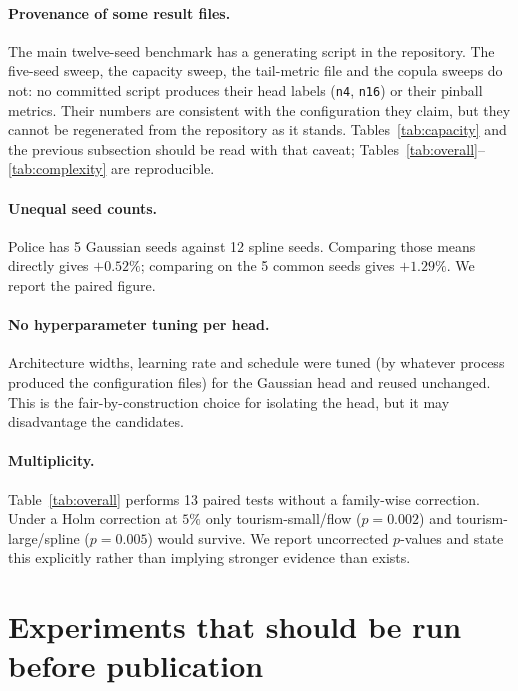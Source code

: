 \documentclass[11pt]{article}
\begin{document}
\paragraph{Provenance of some result files.} The main twelve-seed benchmark has a
generating script in the repository. The five-seed sweep, the capacity sweep, the
tail-metric file and the copula sweeps do not: no committed script produces their
head labels (\texttt{n4}, \texttt{n16}) or their pinball metrics. Their numbers are
consistent with the configuration they claim, but they cannot be regenerated from the
repository as it stands. Tables~\ref{tab:capacity} and the previous subsection should
be read with that caveat; Tables~\ref{tab:overall}--\ref{tab:complexity} are
reproducible.

\paragraph{Unequal seed counts.} Police has 5 Gaussian seeds against 12 spline seeds.
Comparing those means directly gives $+0.52\%$; comparing on the 5 common seeds gives
$+1.29\%$. We report the paired figure.

\paragraph{No hyperparameter tuning per head.} Architecture widths, learning rate and
schedule were tuned (by whatever process produced the configuration files) for the
Gaussian head and reused unchanged. This is the fair-by-construction choice for
isolating the head, but it may disadvantage the candidates.

\paragraph{Multiplicity.} Table~\ref{tab:overall} performs 13 paired tests without a
family-wise correction. Under a Holm correction at $5\%$ only tourism-small/flow
($p=0.002$) and tourism-large/spline ($p=0.005$) would survive. We report uncorrected
$p$-values and state this explicitly rather than implying stronger evidence than
exists.

\section{Experiments that should be run before publication}
\label{sec:missing}
\end{document}
